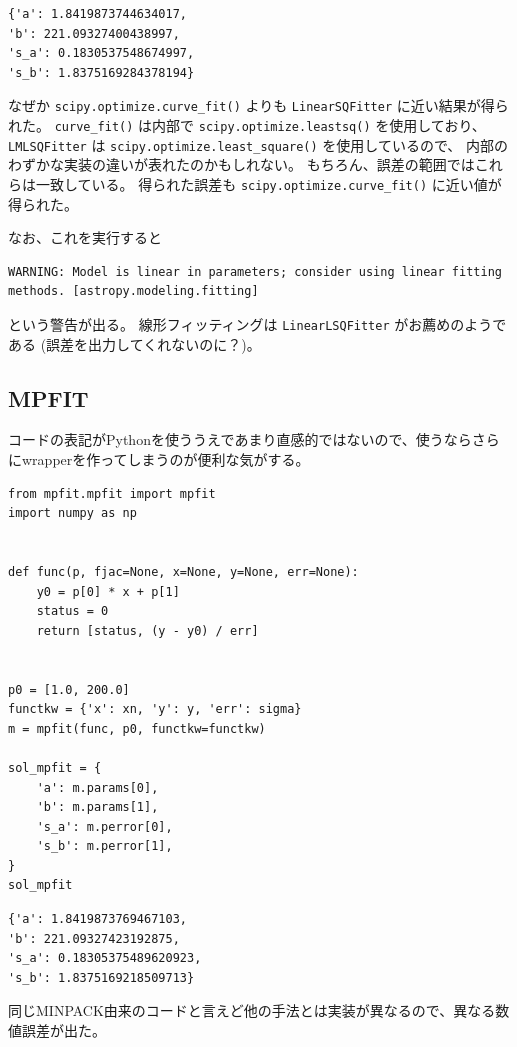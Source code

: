 \documentclass[a4paper, 9pt, notitlepage, uplatex, dvipdfmx]{jsarticle}
\begin{document}
\label{}
\begin{verbatim}
{'a': 1.8419873744634017,
'b': 221.09327400438997,
's_a': 0.1830537548674997,
's_b': 1.8375169284378194}
\end{verbatim}

なぜか \texttt{scipy.optimize.curve\_fit()} よりも \texttt{LinearSQFitter} に近い結果が得られた。
\texttt{curve\_fit()} は内部で \texttt{scipy.optimize.leastsq()} を使用しており、 \texttt{LMLSQFitter} は \texttt{scipy.optimize.least\_square()} を使用しているので、
内部のわずかな実装の違いが表れたのかもしれない。
もちろん、誤差の範囲ではこれらは一致している。
得られた誤差も \texttt{scipy.optimize.curve\_fit()} に近い値が得られた。

なお、これを実行すると
\begin{verbatim}
WARNING: Model is linear in parameters; consider using linear fitting methods. [astropy.modeling.fitting]
\end{verbatim}
という警告が出る。
線形フィッティングは \texttt{LinearLSQFitter} がお薦めのようである (誤差を出力してくれないのに？)。
\subsection{MPFIT}
\label{sec:orgdfc115d}
コードの表記がPythonを使ううえであまり直感的ではないので、使うならさらにwrapperを作ってしまうのが便利な気がする。

\begin{verbatim}
from mpfit.mpfit import mpfit
import numpy as np


def func(p, fjac=None, x=None, y=None, err=None):
    y0 = p[0] * x + p[1]
    status = 0
    return [status, (y - y0) / err]


p0 = [1.0, 200.0]
functkw = {'x': xn, 'y': y, 'err': sigma}
m = mpfit(func, p0, functkw=functkw)

sol_mpfit = {
    'a': m.params[0],
    'b': m.params[1],
    's_a': m.perror[0],
    's_b': m.perror[1],
}
sol_mpfit
\end{verbatim}

\label{}
\begin{verbatim}
{'a': 1.8419873769467103,
'b': 221.09327423192875,
's_a': 0.18305375489620923,
's_b': 1.8375169218509713}
\end{verbatim}

同じMINPACK由来のコードと言えど他の手法とは実装が異なるので、異なる数値誤差が出た。
\end{document}
